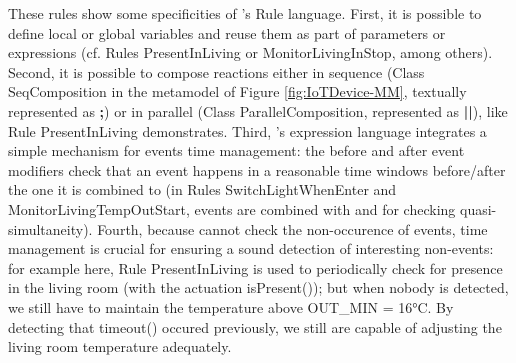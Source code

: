 These rules show some specificities of \IOTDSL's Rule language. First, it is possible to define local or global variables and reuse them as part of parameters or expressions (cf. Rules \textsf{PresentInLiving} or \textsf{MonitorLivingInStop}, among others). Second, it is possible to compose reactions either in sequence (Class \textsf{SeqComposition} in the metamodel of Figure \ref{fig:IoTDevice-MM}, textually represented as \textsf{\textbf{;}}) or in parallel (Class \textsf{ParallelComposition}, represented as \textsf{\textbf{||}}), like Rule \textsf{PresentInLiving} demonstrates. Third, \IOTDSL's expression language integrates a simple mechanism for events time management: the \textsf{before} and \textsf{after} event modifiers check that an event happens in a reasonable time windows before/after the one it is combined to (in Rules \textsf{SwitchLightWhenEnter} and \textsf{MonitorLivingTempOutStart}, events are combined with \textsf{and} for checking quasi-simultaneity). Fourth, because \IOTDSL cannot check the non-occurence of events, time management is crucial for ensuring a sound detection of interesting non-events: for example here, Rule \textsf{PresentInLiving} is used to periodically check for presence in the living room (with the actuation \textsf{isPresent()}); but when nobody is detected, we still have to maintain the temperature above \textsf{OUT\_MIN} = 16°C. By detecting that \textsf{timeout()} occured previously, we still are capable of adjusting the living room temperature adequately.
